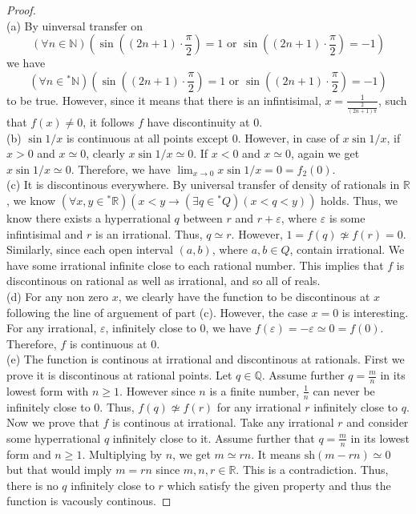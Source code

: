 \documentclass[a4paper, 11pt, openany]{book}
\theoremstyle{plain}
\theoremstyle{plain}
\newcommand{\arr}{\rightarrow}
\newcommand{\N}{\mathbb{N}}
\newcommand{\Q}{\mathbb{Q}}
\newcommand{\R}{\mathbb{R}}
\newcommand{\ep}{\varepsilon}
\newcommand{\hyp}{{}^*}
\newcommand{\sh}{\text{sh}}
\begin{document}
  \begin{proof} $ $ \\
    (a) By uinversal transfer on $$(\forall n \in \N)\left(\sin \left((2n+1)\cdot \frac{\pi}{2}\right)=1 \text{ or } \sin \left((2n+1)\cdot \frac{\pi}{2}\right)=-1\right)$$ we have $$(\forall n \in \hyp \N)\left(\sin \left((2n+1)\cdot \frac{\pi}{2}\right)=1 \text{ or } \sin \left((2n+1)\cdot \frac{\pi}{2}\right)=-1\right)$$ to be true. However, since it means that there is an infintisimal, $x=\frac{1}{\frac{2}{(2n+1)\pi}}$, such that $f(x) \not =0$, it follows $f$ have discontinuity at $0$. \\

    (b) $\sin 1/x$ is continuous at all points except $0$. However, in case of $x \sin 1/x$, if $x>0$ and $x \simeq 0$, clearly $x \sin 1/x \simeq 0$. If $x<0$ and $x \simeq 0$, again we get $x \sin 1/x \simeq 0$. Therefore, we have $\lim_{x \arr 0} x \sin 1/x=0=f_2(0)$. \\

    (c) It is discontinous everywhere. By universal transfer of density of rationals in $\R$, we know $(\forall x,y \in \hyp \R)(x<y \arr (\exists q \in \hyp Q)(x<q<y))$ holds. Thus, we know there exists a hyperrational $q$ between $r$ and $r+\ep$, where $\ep$ is some infintisimal and $r$ is an irrational. Thus, $q \simeq r$. However, $1=f(q) \not \simeq f(r)=0$. Similarly, since each open interval $(a,b)$, where $a,b \in Q$, contain irrational. We have some irrational infinite close to each rational number. This implies that $f$ is discontinous on rational as well as irrational, and so all of reals.  \\

    (d) For any non zero $x$, we clearly have the function to be discontinous at $x$ following the line of arguement of part (c). However, the case $x=0$ is interesting. For any irrational, $\ep$, infinitely close to $0$, we have $f(\ep)=-\ep \simeq 0 = f(0)$. Therefore, $f$ is continuous at $0$. \\

    (e) The function is continous at irrational and discontinous at rationals. First we prove it is discontinous at rational points. Let $q \in \Q$. Assume further $q=\frac{m}{n}$ in its lowest form with $n \geq 1$. However since $n$ is a finite number, $\frac{1}{n}$ can never be infinitely close to $0$. Thus, $f(q) \not \simeq f(r)$ for any irrational $r$ infinitely close to $q$. Now we prove that $f$ is continous at irrational. Take any irrational $r$ and consider some hyperrational $q$ infinitely close to it. Assume further that $q=\frac{m}{n}$ in its lowest form and $n\geq 1$. Multiplying by $n$, we get $m \simeq rn$. It means $\sh(m-rn) \simeq 0$ but that would imply $m=rn$ since $m,n,r \in \R$. This is a contradiction. Thus, there is no $q$ infinitely close to $r$ which satisfy the given property and thus the function is vacously continous.
  \end{proof}
\end{document}
